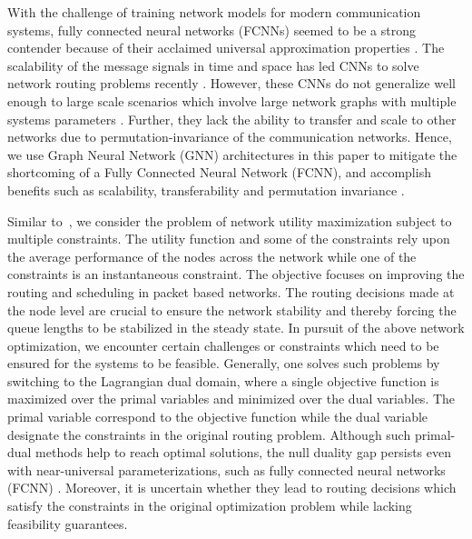 \documentclass[lettersize,journal]{IEEEtran}
\begin{document}
With the challenge of training network models for modern communication systems, fully connected neural networks (FCNNs) seemed to be a strong contender because of their acclaimed universal approximation properties \cite{jia2014caffe, sun2017learning, eisen2020optimal, peng2017modulation}. The scalability of the message signals in time and space has led CNNs to solve network routing problems recently \cite{zhang2023admire, he2020machine}. However, these CNNs do not generalize well enough to large scale scenarios which involve large network graphs with multiple systems parameters \cite{shen2022graph}. Further, they lack the ability to transfer and scale to other networks due to permutation-invariance of the communication networks. Hence, we use Graph Neural Network (GNN) architectures in this paper to mitigate the shortcoming of a Fully Connected Neural Network (FCNN), and accomplish benefits such as scalability, transferability and permutation invariance \cite{henaff2015deep, gama2018convolutional}.

Similar to~\cite{eisen2020optimal, ribeiro2012optimal, naderializadeh2023learning, naderializadeh2022state, xia2018utility, zargham2013accelerated, ribeiro2009stochastic, xia2017stochastic, xia2014distributed}, we consider the problem of network utility maximization subject to multiple constraints. The utility function and some of the constraints rely upon the average performance of the nodes across the network while one of the constraints is an instantaneous constraint. The objective focuses on improving the routing and scheduling in packet based networks. The routing decisions made at the node level are crucial to ensure the network stability and thereby forcing the queue lengths to be stabilized in the steady state. In pursuit of the above network optimization, we encounter certain challenges or constraints which need to be ensured for the systems to be feasible. Generally, one solves such problems by switching to the Lagrangian dual domain, where a single objective function is maximized over the primal variables and minimized over the dual variables. The primal variable correspond to the objective function while the dual variable designate the constraints in the original routing problem. Although such primal-dual methods help to reach optimal solutions, the null duality gap persists even with near-universal parameterizations, such as fully connected neural networks (FCNN) \cite{naderializadeh2022state}. Moreover, it is uncertain whether they lead to routing decisions which satisfy the constraints in the original optimization problem while lacking feasibility guarantees. 
\end{document}
